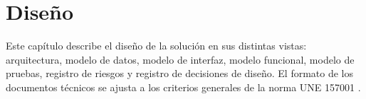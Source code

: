 \chapter{Diseño}
\label{ch:diseno}

Este capítulo describe el diseño de la solución en sus distintas vistas:
arquitectura, modelo de datos, modelo de interfaz, modelo funcional, modelo de
pruebas, registro de riesgos y registro de decisiones de diseño. El formato de
los documentos técnicos se ajusta a los criterios generales de la norma UNE
157001 \cite{une157001}.








